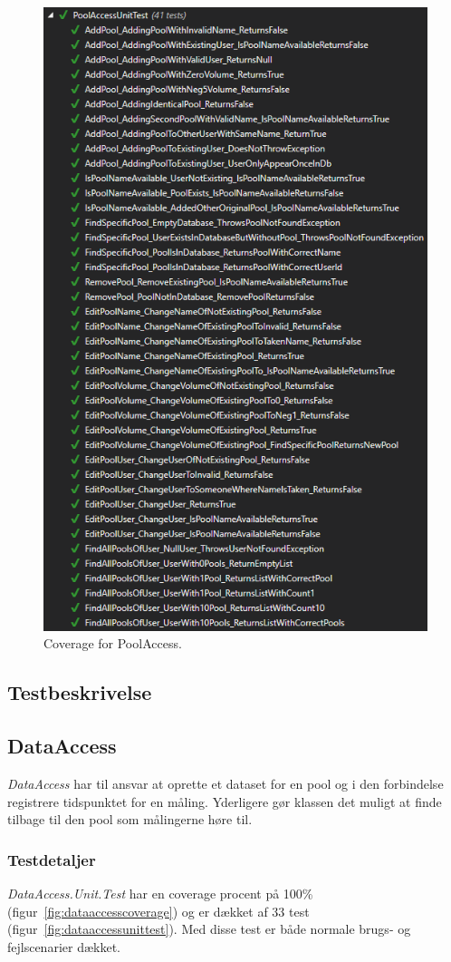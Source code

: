 \begin{figure}[h]
	\centering
	\includegraphics[width=0.7\linewidth]{figs/test/poolaccessunittest}
	\caption{Coverage for PoolAccess.}
	\label{fig:poolaccessunittest}
\end{figure}

\subsection{Testbeskrivelse}

\subsection{DataAccess}
\textit{DataAccess} har til ansvar at oprette et dataset for en pool og i den forbindelse registrere tidspunktet for en måling. Yderligere gør klassen det muligt at finde tilbage til den pool som målingerne høre til.

\subsubsection{Testdetaljer}
\textit{DataAccess.Unit.Test} har en coverage procent på 100\% (figur~\ref{fig:dataaccesscoverage}) og er dækket af 33 test (figur~\ref{fig:dataaccessunittest}). Med disse test er både normale brugs- og fejlscenarier dækket.


